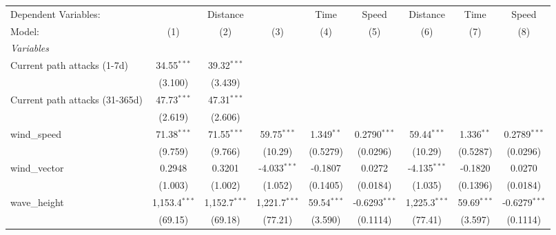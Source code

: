
\begingroup
\centering
\begin{tabular}{lcccccccc}
   \tabularnewline \midrule \midrule
   Dependent Variables: & \multicolumn{3}{c}{Distance} & Time & Speed & Distance & Time & Speed\\
   Model:                                & (1)             & (2)             & (3)             & (4)            & (5)             & (6)             & (7)            & (8)\\  
   \midrule
   \emph{Variables}\\
   Current path attacks (1-7d)           & 34.55$^{***}$   & 39.32$^{***}$   &                 &                &                 &                 &                &   \\   
                                         & (3.100)         & (3.439)         &                 &                &                 &                 &                &   \\   
   Current path attacks (31-365d)        & 47.73$^{***}$   & 47.31$^{***}$   &                 &                &                 &                 &                &   \\   
                                         & (2.619)         & (2.606)         &                 &                &                 &                 &                &   \\   
   wind\_speed                           & 71.38$^{***}$   & 71.55$^{***}$   & 59.75$^{***}$   & 1.349$^{**}$   & 0.2790$^{***}$  & 59.44$^{***}$   & 1.336$^{**}$   & 0.2789$^{***}$\\   
                                         & (9.759)         & (9.766)         & (10.29)         & (0.5279)       & (0.0296)        & (10.29)         & (0.5287)       & (0.0296)\\   
   wind\_vector                          & 0.2948          & 0.3201          & -4.033$^{***}$  & -0.1807        & 0.0272          & -4.135$^{***}$  & -0.1820        & 0.0270\\   
                                         & (1.003)         & (1.002)         & (1.052)         & (0.1405)       & (0.0184)        & (1.035)         & (0.1396)       & (0.0184)\\   
   wave\_height                          & 1,153.4$^{***}$ & 1,152.7$^{***}$ & 1,221.7$^{***}$ & 59.54$^{***}$  & -0.6293$^{***}$ & 1,225.3$^{***}$ & 59.69$^{***}$  & -0.6279$^{***}$\\   
                                         & (69.15)         & (69.18)         & (77.21)         & (3.590)        & (0.1114)        & (77.41)         & (3.597)        & (0.1114)\\   

\end{tabular}
